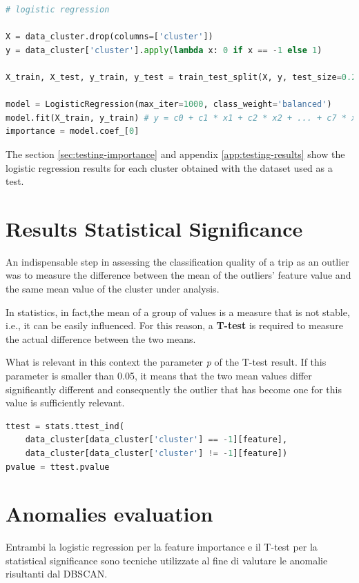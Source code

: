 \begin{lstlisting}[language=Python]
# logistic regression

X = data_cluster.drop(columns=['cluster'])
y = data_cluster['cluster'].apply(lambda x: 0 if x == -1 else 1)

X_train, X_test, y_train, y_test = train_test_split(X, y, test_size=0.2, stratify=y, random_state=42)

model = LogisticRegression(max_iter=1000, class_weight='balanced')
model.fit(X_train, y_train) # y = c0 + c1 * x1 + c2 * x2 + ... + c7 * x7
importance = model.coef_[0]
\end{lstlisting}

The section \ref{sec:testing-importance} and appendix \ref{app:testing-results} show the logistic regression results for each cluster obtained with the dataset used as a test.


\clearpage
\section{Results Statistical Significance}
\label{sec:significance}

An indispensable step in assessing the classification quality of a trip as an outlier was to measure the difference between the mean of the outliers' feature value and the same mean value of the cluster under analysis.

In statistics, in fact,the mean of a group of values is a measure that is not stable, i.e., it can be easily influenced. For this reason, a \textbf{T-test} is required to measure the actual difference between the two means.

What is relevant in this context the parameter \textit{p} of the T-test result. If this parameter is smaller than 0.05, it means that the two mean values differ significantly different and consequently the outlier that has become one for this value is sufficiently relevant.

\begin{lstlisting}[language=Python]
ttest = stats.ttest_ind(
    data_cluster[data_cluster['cluster'] == -1][feature],
    data_cluster[data_cluster['cluster'] != -1][feature])
pvalue = ttest.pvalue
\end{lstlisting}


\section{Anomalies evaluation}
Entrambi la logistic regression per la feature importance e il T-test per la statistical significance sono tecniche utilizzate al fine di valutare le anomalie risultanti dal DBSCAN.

